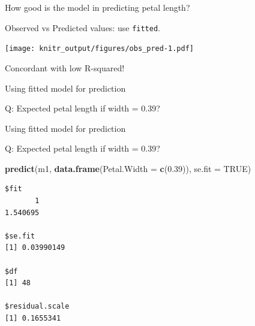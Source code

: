 \documentclass[10pt,ignorenonframetext,]{beamer}
\newenvironment{Shaded}{\begin{snugshade}}{\end{snugshade}}
\newcommand{\KeywordTok}[1]{\textcolor[rgb]{0.13,0.29,0.53}{\textbf{{#1}}}}
\newcommand{\DataTypeTok}[1]{\textcolor[rgb]{0.13,0.29,0.53}{{#1}}}
\newcommand{\DecValTok}[1]{\textcolor[rgb]{0.00,0.00,0.81}{{#1}}}
\newcommand{\FloatTok}[1]{\textcolor[rgb]{0.00,0.00,0.81}{{#1}}}
\newcommand{\StringTok}[1]{\textcolor[rgb]{0.31,0.60,0.02}{{#1}}}
\newcommand{\OtherTok}[1]{\textcolor[rgb]{0.56,0.35,0.01}{{#1}}}
\newcommand{\NormalTok}[1]{{#1}}
\begin{document}
\begin{frame}[fragile]{How good is the model in predicting petal
length?}

Observed vs Predicted values: use \texttt{fitted}.

\begin{Shaded}
\end{Shaded}

\texttt{[image: knitr\_output/figures/obs\_pred-1.pdf]}

Concordant with low R-squared!

\end{frame}

\begin{frame}{Using fitted model for prediction}

Q: Expected petal length if width = 0.39?

\end{frame}

\begin{frame}[fragile]{Using fitted model for prediction}

Q: Expected petal length if width = 0.39?

\begin{Shaded}
\begin{Highlighting}[]
\KeywordTok{predict}\NormalTok{(m1, }\KeywordTok{data.frame}\NormalTok{(}\DataTypeTok{Petal.Width =} \KeywordTok{c}\NormalTok{(}\FloatTok{0.39}\NormalTok{)), }\DataTypeTok{se.fit =} \OtherTok{TRUE}\NormalTok{)}
\end{Highlighting}
\end{Shaded}

\begin{verbatim}
$fit
       1 
1.540695 

$se.fit
[1] 0.03990149

$df
[1] 48

$residual.scale
[1] 0.1655341
\end{verbatim}

\end{frame}
\end{document}
